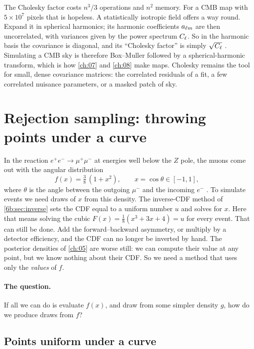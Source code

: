 The Cholesky factor costs $n^3/3$ operations and $n^2$ memory. For a CMB map with
$5\times10^7$ pixels that is hopeless. A statistically isotropic field offers a way
round. Expand it in spherical harmonics; its harmonic coefficients $a_{\ell m}$ are then
uncorrelated, with variances given by the power spectrum $C_\ell$. So in the
harmonic basis the covariance is diagonal, and its ``Cholesky factor'' is simply
$\sqrt{C_\ell}$ . Simulating a CMB sky is therefore Box--Muller followed by a
spherical-harmonic transform, which is how \cref{ch:07} and \cref{ch:08} make maps.
Cholesky remains the tool for small, dense covariance matrices: the correlated
residuals of a fit, a few correlated nuisance parameters, or a masked patch of sky.
\section{Rejection sampling: throwing points under a curve}
\label{6b:sec:rejection}

In the reaction $e^+e^-\to\mu^+\mu^-$ at energies well below the $Z$ pole, the
muons come out with the angular distribution
\begin{equation}
  f(x)=\tfrac38\,(1+x^2),\qquad x=\cos\theta\in[-1,1],
  \label{6b:eq:mumu}
\end{equation}
where $\theta$ is the angle between the outgoing $\mu^-$ and the incoming $e^-$
. To simulate events we need draws of $x$ from this density.
The inverse-CDF method of \cref{6b:sec:inverse} sets the CDF equal to a uniform
number $u$ and solves for $x$. Here that means solving the cubic
$F(x)=\tfrac18(x^3+3x+4)=u$ for every event. That can still be done. Add the
forward--backward asymmetry, or multiply by a detector efficiency, and the CDF can
no longer be inverted by hand. The posterior densities of \cref{ch:05} are worse
still: we can compute their value at any point, but we know nothing about their
CDF. So we need a method that uses only the \emph{values} of $f$.

\paragraph{The question.} If all we can do is evaluate $f(x)$, and draw from some
simpler density $g$, how do we produce draws from $f$?

\subsection{Points uniform under a curve}
\label{6b:sec:under-curve}

